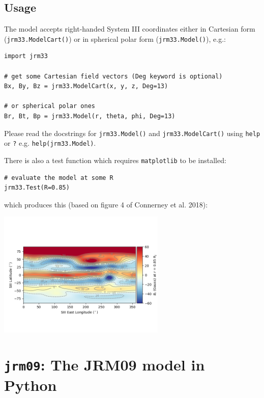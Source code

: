 	\subsection{Usage}
	
	The model accepts right-handed System III coordinates either in Cartesian form (\texttt{jrm33.ModelCart()}) or in spherical polar form (\texttt{jrm33.Model()}), e.g.:
	
	\begin{verbatim}
import jrm33
	
# get some Cartesian field vectors (Deg keyword is optional)
Bx, By, Bz = jrm33.ModelCart(x, y, z, Deg=13)
	
# or spherical polar ones
Br, Bt, Bp = jrm33.Model(r, theta, phi, Deg=13)
	\end{verbatim}
	
	Please read the docstrings for \texttt{jrm33.Model()} and \texttt{jrm33.ModelCart()} using \texttt{help} or \texttt{?} e.g. \texttt{help(jrm33.Model)}.
	
	There is also a test function which requires \texttt{matplotlib} to be installed:
	
	\begin{verbatim}
# evaluate the model at some R
jrm33.Test(R=0.85)
	\end{verbatim}
	
	which produces this (based on figure 4 of Connerney et al. 2018):
	
	\begin{center}
		\includegraphics[width=0.6\textwidth]{figures/ch3_jrm33test.png}
	\end{center}
	



	\section{\texttt{jrm09}: The JRM09 model in Python}

